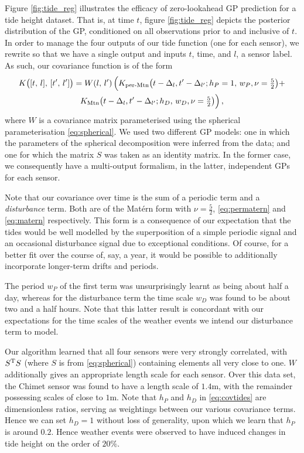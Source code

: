 \documentclass{acmtrans2m}
\newcommand{\dnt}[1]{_{{#1}}}
\newcommand{\Kl}[1]{K_{\text{#1}}}
\begin{document}
Figure \ref{fig:tide_reg} illustrates the efficacy of zero-lookahead GP prediction for a tide height dataset. That is, at time $t$, figure \ref{fig:tide_reg} depicts the posterior distribution of the GP, conditioned on all observations prior to and inclusive of $t$. 
In order to manage the four outputs of our tide function (one for each sensor), we rewrite so that we have a single output and inputs $t$, time, and $l$, a sensor label. As such, our covariance function is of the form
\begin{multline} \label{eq:covtides}
 K\bigl([t,\,l],\,[t',\,l']\bigr)={W}(l,\,l')\,\Bigl(
\Kl{per-Mtn}\bigl(t-\Delta_{l},t'-\Delta_{l'};h\dnt{P}=1,\,w\dnt{P},\nu=\tfrac{5}{2}\bigr)+
\\
\Kl{Mtn}\bigl(t-\Delta_{l},t'-\Delta_{l'};h\dnt{D},\,w\dnt{D},\nu=\tfrac{5}{2}\bigr)
\Bigr)\,,
\end{multline}
where $W$ is a covariance matrix parameterised using the spherical parameterisation \eqref{eq:spherical}. We used two different GP models: one in which the parameters of the spherical decomposition were inferred from the data; and one for which the matrix $S$ was taken as an identity matrix. In the former case, we consequently have a multi-output formalism, in the latter, independent GPs for each sensor.

 Note that our covariance over time is the sum of a periodic term and a \emph{disturbance} term. Both are of the Mat\'{e}rn form with 
$\nu=\frac{5}{2}$, \eqref{eq:permatern} and \eqref{eq:matern} respectively. 
This form is a consequence of our expectation that the tides would be well modelled by the superposition of a simple periodic signal and an occasional disturbance signal due to exceptional conditions. Of course, for a better fit over the course of, say, a year, it would be possible to additionally incorporate longer-term drifts and periods.

The period $w_P$ of the first term was unsurprisingly learnt as being about half a day, whereas for the disturbance term the time scale $w\dnt{D}$ was found to be about two and a half hours. Note that this latter result is concordant with our expectations for the time scales of the weather events we intend our disturbance term to model. 

Our algorithm learned that all four sensors were very strongly correlated, with $S^{\mathrm{T}} S$ (where $S$ is from \eqref{eq:spherical})  containing elements all very close to one. $W$ additionally gives an appropriate length scale for each sensor. Over this data set, the Chimet sensor was found to have a length scale of $1.4$m, with the remainder possessing scales of close to $1$m. Note that $h\dnt{P}$ and $h\dnt{D}$ in \eqref{eq:covtides} are dimensionless ratios, serving as weightings between our various covariance terms. Hence we can set $h\dnt{D}=1$ without loss of generality, upon which we learn that $h\dnt{P}$ is around $0.2$. Hence weather events were observed to have induced changes in tide height on the order of $20\%$.
\end{document}
